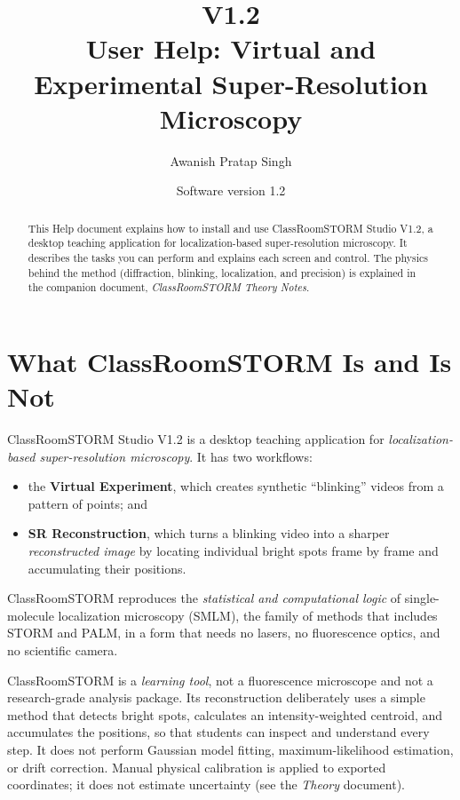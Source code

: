 \documentclass[11pt,a4paper]{article}
\title{\textbf{\studio{} V1.2}\\[2pt]\large User Help: Virtual and Experimental
       Super-Resolution Microscopy}
\author{Awanish Pratap Singh}
\date{Software version 1.2}
\newcommand{\app}{ClassRoomSTORM}
\newcommand{\studio}{\app{} Studio}
\begin{document}
\maketitle
\thispagestyle{empty}

\begin{abstract}
\noindent This Help document explains how to install and use \studio{} V1.2, a
desktop teaching application for localization-based super-resolution microscopy.
It describes the tasks you can perform and explains each screen and control. The physics
behind the method (diffraction, blinking, localization, and precision) is
explained in the companion document, \emph{\app{} Theory Notes}.
\end{abstract}

\begingroup\small\tableofcontents\endgroup
\newpage

\section{What \app{} Is and Is Not}
\label{sec:what}

\studio{} V1.2 is a desktop teaching application for \emph{localization-based
super-resolution microscopy}. It has two workflows:

\begin{itemize}
  \item the \textbf{Virtual Experiment}, which creates synthetic ``blinking''
        videos from a pattern of points; and
  \item \textbf{SR Reconstruction}, which turns a blinking video into a sharper
        \emph{reconstructed image} by locating individual bright spots frame by
        frame and accumulating their positions.
\end{itemize}

\app{} reproduces the \emph{statistical and computational logic} of
single-molecule localization microscopy (SMLM), the family of methods that includes STORM and PALM, in a form that needs no lasers, no fluorescence
optics, and no scientific camera.

\begin{csnote}
\app{} is a \emph{learning tool}, not a fluorescence microscope and not a
research-grade analysis package. Its reconstruction deliberately uses a simple method that detects bright spots, calculates an intensity-weighted centroid, and accumulates the positions, so that students can inspect and understand every step. It
does not perform Gaussian model fitting, maximum-likelihood estimation,
or drift correction. Manual physical calibration is applied to exported
coordinates; it does not estimate uncertainty (see the \emph{Theory} document).
\end{csnote}
\end{document}
